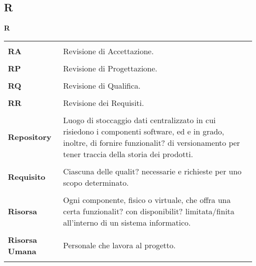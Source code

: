 {\subsection{R} 
\hfill\Huge{\textbf{R}} \\ 
\normalsize 
\begin{longtabu} to 
\toprule \\ 
\textbf{RA} & Revisione di Accettazione. \\ 
 \\ 
\textbf{RP} & Revisione di Progettazione. \\ 
 \\ 
\textbf{RQ} & Revisione di Qualifica. \\ 
 \\ 
\textbf{RR} & Revisione dei Requisiti. \\ 
 \\ 
\textbf{Repository} & Luogo di stoccaggio dati centralizzato in cui risiedono i componenti software, ed e in grado, inoltre, di fornire funzionalit? di versionamento per tener traccia della storia dei prodotti. \\ 
 \\ 
\textbf{Requisito} & Ciascuna delle qualit? necessarie e richieste per uno scopo determinato. \\ 
 \\ 
\textbf{Risorsa} & Ogni componente, fisico o virtuale, che offra una certa funzionalit? con disponibilit? limitata/finita all'interno di un sistema informatico. \\ 
 \\ 
\textbf{Risorsa Umana} & Personale che lavora al progetto. \\ 
 \\ 
\end{longtabu} 
\newpage 
}
